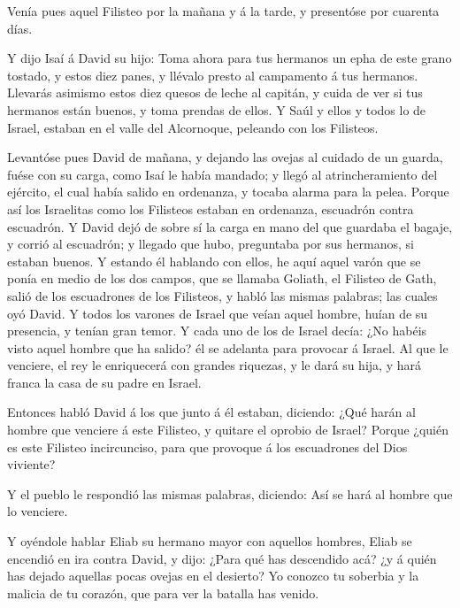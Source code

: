  Venía pues aquel Filisteo por la mañana y á la tarde, y
presentóse por cuarenta días.

 Y dijo Isaí á David su hijo: Toma ahora para tus
hermanos un epha de este grano tostado, y estos diez panes, y llévalo
presto al campamento á tus hermanos.  Llevarás asimismo
estos diez quesos de leche al capitán, y cuida de ver si tus hermanos
están buenos, y toma prendas de ellos.  Y Saúl y ellos y
todos lo de Israel, estaban en el valle del Alcornoque, peleando con los
Filisteos.

 Levantóse pues David de mañana, y dejando las ovejas al
cuidado de un guarda, fuése con su carga, como Isaí le había mandado; y
llegó al atrincheramiento del ejército, el cual había salido en
ordenanza, y tocaba alarma para la pelea.  Porque así los
Israelitas como los Filisteos estaban en ordenanza, escuadrón contra
escuadrón.  Y David dejó de sobre sí la carga en mano del
que guardaba el bagaje, y corrió al escuadrón; y llegado que hubo,
preguntaba por sus hermanos, si estaban buenos.  Y
estando él hablando con ellos, he aquí aquel varón que se ponía en medio
de los dos campos, que se llamaba Goliath, el Filisteo de Gath, salió de
los escuadrones de los Filisteos, y habló las mismas palabras; las
cuales oyó David.  Y todos los varones de Israel que
veían aquel hombre, huían de su presencia, y tenían gran temor.
 Y cada uno de los de Israel decía: ¿No habéis visto
aquel hombre que ha salido? él se adelanta para provocar á Israel. Al
que le venciere, el rey le enriquecerá con grandes riquezas, y le dará
su hija, y hará franca la casa de su padre en Israel.

 Entonces habló David á los que junto á él estaban,
diciendo: ¿Qué harán al hombre que venciere á este Filisteo, y quitare
el oprobio de Israel? Porque ¿quién es este Filisteo incircunciso, para
que provoque á los escuadrones del Dios viviente?

 Y el pueblo le respondió las mismas palabras, diciendo:
Así se hará al hombre que lo venciere.

 Y oyéndole hablar Eliab su hermano mayor con aquellos
hombres, Eliab se encendió en ira contra David, y dijo: ¿Para qué has
descendido acá? ¿y á quién has dejado aquellas pocas ovejas en el
desierto? Yo conozco tu soberbia y la malicia de tu corazón, que para
ver la batalla has venido.

